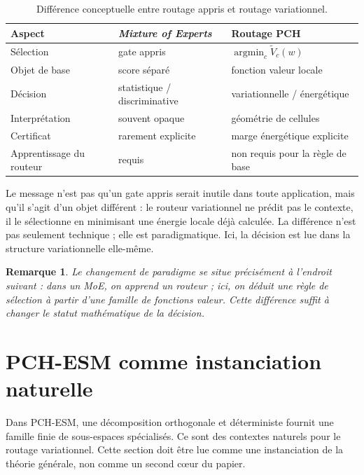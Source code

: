 \documentclass[11pt,a4paper]{article}
\newtheorem{remark}{Remarque}[section]
\DeclareMathOperator{\argmin}{argmin}
\begin{document}
\begin{table}[ht]
\centering
\begin{tabular}{@{}lll@{}}
\toprule
Aspect & \emph{Mixture of Experts} & Routage PCH \\
\midrule
Sélection & gate appris & \(\argmin_c \widetilde V_c(w)\) \\
Objet de base & score séparé & fonction valeur locale \\
Décision & statistique / discriminative & variationnelle / énergétique \\
Interprétation & souvent opaque & géométrie de cellules \\
Certificat & rarement explicite & marge énergétique explicite \\
Apprentissage du routeur & requis & non requis pour la règle de base \\
\bottomrule
\end{tabular}
\caption{Différence conceptuelle entre routage appris et routage variationnel.}
\end{table}

Le message n'est pas qu'un gate appris serait inutile dans toute application, mais qu'il s'agit d'un objet différent : le routeur variationnel ne prédit pas le contexte, il le sélectionne en minimisant une énergie locale déjà calculée. La différence n'est pas seulement technique ; elle est paradigmatique. Ici, la décision est lue dans la structure variationnelle elle-même.

\begin{remark}
Le changement de paradigme se situe précisément à l'endroit suivant : dans un MoE, on apprend un routeur ; ici, on déduit une règle de sélection à partir d'une famille de fonctions valeur. Cette différence suffit à changer le statut mathématique de la décision.
\end{remark}

\section{PCH-ESM comme instanciation naturelle}

Dans PCH-ESM, une décomposition orthogonale et déterministe fournit une famille finie de sous-espaces spécialisés. Ce sont des contextes naturels pour le routage variationnel. Cette section doit être lue comme une instanciation de la théorie générale, non comme un second cœur du papier.
\end{document}
